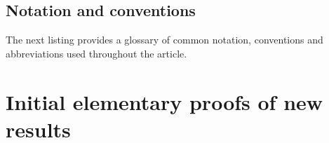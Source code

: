 \documentclass[11pt,reqno,a4letter]{article}
\numberwithin{figure}{section}
\numberwithin{table}{section}
\theoremstyle{plain}
\numberwithin{theorem}{section}
\theoremstyle{definition}
\newtheorem{remark}[theorem]{Remark}
\begin{document}

\subsection{Notation and conventions}

The next listing provides a glossary of common notation, conventions and 
abbreviations used throughout the article. 

\renewcommand{\glossarysection}[2][]{}
\printglossary[type={symbols},
               style={glossstyleSymbol},
               nogroupskip=true]

\newpage 
\section{Initial elementary proofs of new results} 
\label{Section_PrelimProofs_Config} 
\end{document}
